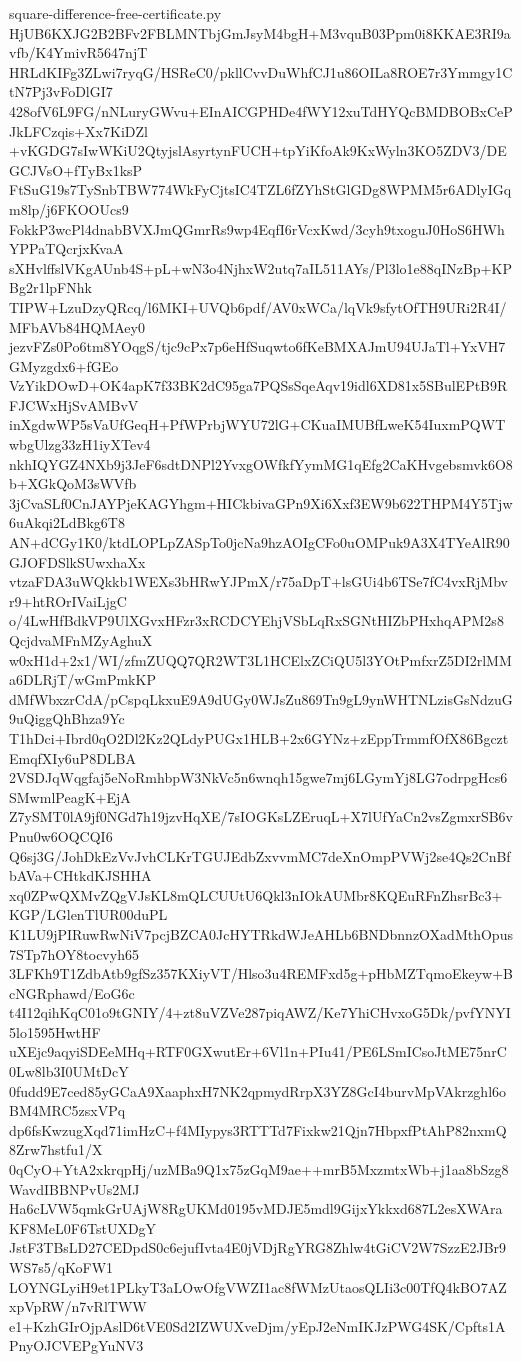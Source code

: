 \documentclass[11pt]{article}
\theoremstyle{definition}
\theoremstyle{remark}
\begin{document}
\begin{filecontents*}[overwrite]{square-difference-free-certificate.py}
HjUB6KXJG2B2BFv2FBLMNTbjGmJsyM4bgH+M3vquB03Ppm0i8KKAE3RI9avfb/K4YmivR5647njT
HRLdKIFg3ZLwi7ryqG/HSReC0/pkllCvvDuWhfCJ1u86OILa8ROE7r3Ymmgy1CtN7Pj3vFoDlGI7
428ofV6L9FG/nNLuryGWvu+EInAICGPHDe4fWY12xuTdHYQcBMDBOBxCePJkLFCzqis+Xx7KiDZl
+vKGDG7sIwWKiU2QtyjslAsyrtynFUCH+tpYiKfoAk9KxWyln3KO5ZDV3/DEGCJVsO+fTyBx1ksP
FtSuG19s7TySnbTBW774WkFyCjtsIC4TZL6fZYhStGlGDg8WPMM5r6ADlyIGqm8lp/j6FKOOUcs9
FokkP3wcPl4dnabBVXJmQGmrRs9wp4EqfI6rVcxKwd/3cyh9txoguJ0HoS6HWhYPPaTQcrjxKvaA
sXHvlffslVKgAUnb4S+pL+wN3o4NjhxW2utq7aIL511AYs/Pl3lo1e88qINzBp+KPBg2r1lpFNhk
TIPW+LzuDzyQRcq/l6MKI+UVQb6pdf/AV0xWCa/lqVk9sfytOfTH9URi2R4I/MFbAVb84HQMAey0
jezvFZs0Po6tm8YOqgS/tjc9cPx7p6eHfSuqwto6fKeBMXAJmU94UJaTl+YxVH7GMyzgdx6+fGEo
VzYikDOwD+OK4apK7f33BK2dC95ga7PQSsSqeAqv19idl6XD81x5SBulEPtB9RFJCWxHjSvAMBvV
inXgdwWP5sVaUfGeqH+PfWPrbjWYU72lG+CKuaIMUBfLweK54IuxmPQWTwbgUlzg33zH1iyXTev4
nkhIQYGZ4NXb9j3JeF6sdtDNPl2YvxgOWfkfYymMG1qEfg2CaKHvgebsmvk6O8b+XGkQoM3sWVfb
3jCvaSLf0CnJAYPjeKAGYhgm+HICkbivaGPn9Xi6Xxf3EW9b622THPM4Y5Tjw6uAkqi2LdBkg6T8
AN+dCGy1K0/ktdLOPLpZASpTo0jcNa9hzAOIgCFo0uOMPuk9A3X4TYeAlR90GJOFDSlkSUwxhaXx
vtzaFDA3uWQkkb1WEXs3bHRwYJPmX/r75aDpT+lsGUi4b6TSe7fC4vxRjMbvr9+htROrIVaiLjgC
o/4LwHfBdkVP9UlXGvxHFzr3xRCDCYEhjVSbLqRxSGNtHIZbPHxhqAPM2s8QcjdvaMFnMZyAghuX
w0xH1d+2x1/WI/zfmZUQQ7QR2WT3L1HCElxZCiQU5l3YOtPmfxrZ5DI2rlMMa6DLRjT/wGmPmkKP
dMfWbxzrCdA/pCspqLkxuE9A9dUGy0WJsZu869Tn9gL9ynWHTNLzisGsNdzuG9uQiggQhBhza9Yc
T1hDci+Ibrd0qO2Dl2Kz2QLdyPUGx1HLB+2x6GYNz+zEppTrmmfOfX86BgcztEmqfXIy6uP8DLBA
2VSDJqWqgfaj5eNoRmhbpW3NkVc5n6wnqh15gwe7mj6LGymYj8LG7odrpgHcs6SMwmlPeagK+EjA
Z7ySMT0lA9jf0NGd7h19jzvHqXE/7sIOGKsLZEruqL+X7lUfYaCn2vsZgmxrSB6vPnu0w6OQCQI6
Q6sj3G/JohDkEzVvJvhCLKrTGUJEdbZxvvmMC7deXnOmpPVWj2se4Qs2CnBfbAVa+CHtkdKJSHHA
xq0ZPwQXMvZQgVJsKL8mQLCUUtU6Qkl3nIOkAUMbr8KQEuRFnZhsrBc3+KGP/LGlenTlUR00duPL
K1LU9jPIRuwRwNiV7pcjBZCA0JcHYTRkdWJeAHLb6BNDbnnzOXadMthOpus7STp7hOY8tocvyh65
3LFKh9T1ZdbAtb9gfSz357KXiyVT/Hlso3u4REMFxd5g+pHbMZTqmoEkeyw+BcNGRphawd/EoG6c
t4I12qihKqC01o9tGNIY/4+zt8uVZVe287piqAWZ/Ke7YhiCHvxoG5Dk/pvfYNYI5lo1595HwtHF
uXEjc9aqyiSDEeMHq+RTF0GXwutEr+6Vl1n+PIu41/PE6LSmICsoJtME75nrC0Lw8lb3I0UMtDcY
0fudd9E7ced85yGCaA9XaaphxH7NK2qpmydRrpX3YZ8GcI4burvMpVAkrzghl6oBM4MRC5zsxVPq
dp6fsKwzugXqd71imHzC+f4MIypys3RTTTd7Fixkw21Qjn7HbpxfPtAhP82nxmQ8Zrw7hstfu1/X
0qCyO+YtA2xkrqpHj/uzMBa9Q1x75zGqM9ae++mrB5MxzmtxWb+j1aa8bSzg8WavdIBBNPvUs2MJ
Ha6cLVW5qmkGrUAjW8RgUKMd0195vMDJE5mdl9GijxYkkxd687L2esXWAraKF8MeL0F6TstUXDgY
JstF3TBsLD27CEDpdS0c6ejufIvta4E0jVDjRgYRG8Zhlw4tGiCV2W7SzzE2JBr9WS7s5/qKoFW1
LOYNGLyiH9et1PLkyT3aLOwOfgVWZI1ac8fWMzUtaosQLIi3c00TfQ4kBO7AZxpVpRW/n7vRlTWW
e1+KzhGIrOjpAslD6tVE0Sd2IZWUXveDjm/yEpJ2eNmIKJzPWG4SK/Cpfts1APnyOJCVEPgYuNV3

\end{filecontents*}
\end{document}
